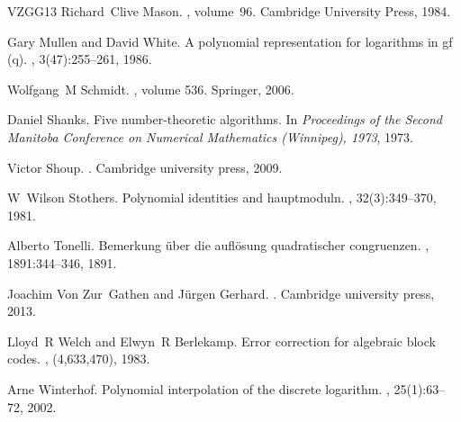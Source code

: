 \documentclass[10pt,a4paper]{article}
\begin{document}
\begin{thebibliography}{VZGG13}
Richard~Clive Mason.
, volume~96.
\newblock Cambridge University Press, 1984.

Gary Mullen and David White.
\newblock A polynomial representation for logarithms in gf (q).
, 3(47):255--261, 1986.

Wolfgang~M Schmidt.
, volume
  536.
\newblock Springer, 2006.

Daniel Shanks.
\newblock Five number-theoretic algorithms.
\newblock In {\em Proceedings of the Second Manitoba Conference on Numerical
  Mathematics (Winnipeg), 1973}, 1973.

Victor Shoup.
.
\newblock Cambridge university press, 2009.

W~Wilson Stothers.
\newblock Polynomial identities and hauptmoduln.
, 32(3):349--370, 1981.

Alberto Tonelli.
\newblock Bemerkung {\"u}ber die aufl{\"o}sung quadratischer congruenzen.
, 1891:344--346, 1891.

Joachim Von Zur~Gathen and J{\"u}rgen Gerhard.
.
\newblock Cambridge university press, 2013.

Lloyd~R Welch and Elwyn~R Berlekamp.
\newblock Error correction for algebraic block codes.
, (4,633,470), 1983.

Arne Winterhof.
\newblock Polynomial interpolation of the discrete logarithm.
, 25(1):63--72, 2002.

\end{thebibliography}
\end{document}
